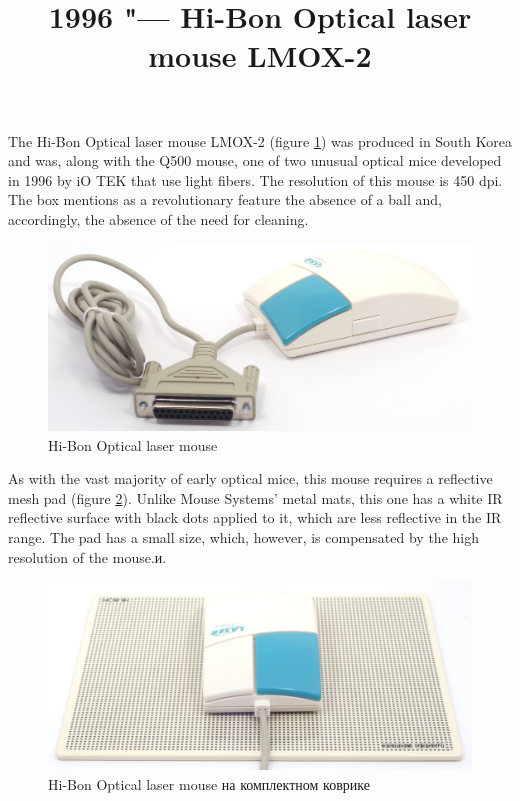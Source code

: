 \documentclass[11pt, a4paper]{article}
\begin{document}
\title{1996 "--- Hi-Bon Optical laser mouse LMOX-2}
\date{}
\maketitle

The Hi-Bon Optical laser mouse LMOX-2 (figure \ref{fig:OpticalLaserMousePic}) was produced in South Korea and was, along with the Q500 mouse, one of two unusual optical mice developed in 1996 by iO TEK that use light fibers. The resolution of this mouse is 450 dpi. The box mentions as a revolutionary feature the absence of a ball and, accordingly, the absence of the need for cleaning.

\begin{figure}[h]
    \centering
    \includegraphics[scale=0.4]{1996_hi-bon_laser_mouse/pic_30.jpg}
    \caption{Hi-Bon Optical laser mouse}
    \label{fig:OpticalLaserMousePic}
\end{figure}

As with the vast majority of early optical mice, this mouse requires a reflective mesh pad (figure \ref{fig:OpticalLaserMousePad}). Unlike Mouse Systems' metal mats, this one has a white IR reflective surface with black dots applied to it, which are less reflective in the IR range. The pad has a small size, which, however, is compensated by the high resolution of the mouse.и.

\begin{figure}[h]
    \centering
    \includegraphics[scale=0.4]{1996_hi-bon_laser_mouse/pic2_30.jpg}
    \caption{Hi-Bon Optical laser mouse на комплектном коврике}
    \label{fig:OpticalLaserMousePad}
\end{figure}
\end{document}
